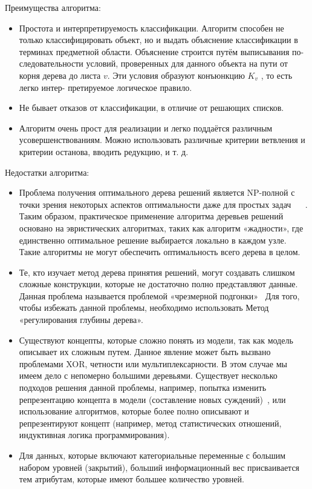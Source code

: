 Преимущества алгоритма:

\begin{itemize}
  \item Простота и интерпретируемость классификации. Алгоритм способен
не только классифицировать объект, но и выдать объяснение классификации
в терминах предметной области. Объяснение строится путём выписывания по-
следовательности условий, проверенных для данного объекта на пути от корня
дерева до листа $v$. Эти условия образуют конъюнкцию $K_v$ , то есть легко интер-
претируемое логическое правило.
  \item Не бывает отказов от классификации, в отличие от решающих списков.
  \item  Алгоритм очень прост для реализации и легко поддаётся различным усовершенствованиям. Можно использовать различные критерии ветвления и критерии останова, вводить редукцию, и т. д.
 \end{itemize}

Недостатки алгоритма:

\begin{itemize}
  \item Проблема получения оптимального дерева решений является NP-полной с точки зрения некоторых аспектов оптимальности даже для простых задач ~\cite{cart_optimal1} ~\cite{cart_optimal2}. Таким образом, практическое применение алгоритма деревьев решений основано на эвристических алгоритмах, таких как алгоритм «жадности», где единственно оптимальное решение выбирается локально в каждом узле. Такие алгоритмы не могут обеспечить оптимальность всего дерева в целом.
  \item Те, кто изучает метод дерева принятия решений, могут создавать слишком сложные конструкции, которые не достаточно полно представляют данные. Данная проблема называется проблемой «чрезмерной подгонки»~\cite{cart_optimal3} Для того, чтобы избежать данной проблемы, необходимо использовать Метод «регулирования глубины дерева».
  \item Существуют концепты, которые сложно понять из модели, так как модель описывает их сложным путем. Данное явление может быть вызвано проблемами XOR, четности или мультиплексарности. В этом случае мы имеем дело с непомерно большими деревьями. Существует несколько подходов решения данной проблемы, например, попытка изменить репрезентацию концепта в модели (составление новых суждений)~\cite{cart_optimal4}, или использование алгоритмов, которые более полно описывают и репрезентируют концепт (например, метод статистических отношений, индуктивная логика программирования).
  \item Для данных, которые включают категориальные переменные с большим набором уровней (закрытий), больший информационный вес присваивается тем атрибутам, которые имеют большее количество уровней.~\cite{cart_optimal5}
 \end{itemize}

